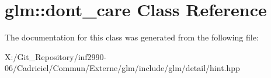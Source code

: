\hypertarget{classglm_1_1dont__care}{\section{glm\-:\-:dont\-\_\-care Class Reference}
\label{classglm_1_1dont__care}
}


The documentation for this class was generated from the following file\-:\begin{DoxyCompactItemize}
\item 
X\-:/\-Git\-\_\-\-Repository/inf2990-\/06/\-Cadriciel/\-Commun/\-Externe/glm/include/glm/detail/hint.\-hpp\end{DoxyCompactItemize}
